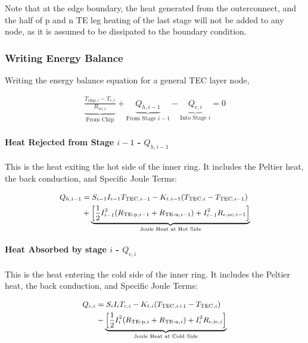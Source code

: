 \documentclass[10pt,a4paper,twocolumn]{article}
\begin{document}
Note that at the edge boundary, the heat generated from the outerconnect, and the half of p and n TE leg heating of the last stage will not be added to any node, as it is assumed to be dissipated to the boundary condition.

\subsubsection{Writing Energy Balance}

Writing the energy balance equation for a general TEC layer node,

\begin{align}
	\underbrace{\frac{T_{\text{chip},i} - T_{c,i}}{R_{\text{ve},i}}}_{\text{From Chip}}+\underbrace{Q_{h, i-1}}_{\text{From Stage } i-1} - \underbrace{Q_{c, i}}_{\text{Into Stage } i} = 0
	\label{eq:TEC_layer_energy_balance}
\end{align}

\paragraph{Heat Rejected from Stage $i-1$ - $Q_{h, i-1}$} This is the heat exiting the hot side of the inner ring. It includes the Peltier heat, the back conduction, and Specific Joule Terms:

\begin{equation}
	\small
	\begin{aligned}
		Q_{h,i-1} & = S_{i-1} I_{i-1} T_{\text{TEC},i-1} - K_{t,i-1}(T_{\text{TEC},i} - T_{\text{TEC},i-1}) \\ &+ \underbrace{\left[ \frac{1}{2}I_{i-1}^2 (R_{\text{TE-p},i-1}+R_{\text{TE-n},i-1})+  I_{i-1}^2 R_{e,\text{oc},i-1} \right]}_{\text{Joule Heat at Hot Side}}
	\end{aligned}
	\label{eq:Q_h_i-1}
\end{equation}

\paragraph{Heat Absorbed by stage $i$ - $Q_{c, i}$} This is the heat entering the cold side of the inner ring. It includes the Peltier heat, the back conduction, and Specific Joule Terms:

\begin{equation}
	\small
	\begin{aligned}
		Q_{c,i} & = S_{i} I_{i} T_{c,i} - K_{t,i}(T_{\text{TEC},i+1} - T_{\text{TEC},i}) \\ &- \underbrace{\left[ \frac{1}{2}I_{i}^2 (R_{\text{TE-p},i}+R_{\text{TE-n},i}) +  I_{i}^2 R_{e,\text{ic},i} \right]}_{\text{Joule Heat at Cold Side}}
		\label{eq:Q_c_i}
	\end{aligned}
\end{equation}
\end{document}
